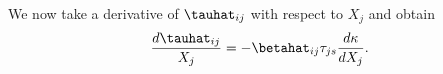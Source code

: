 We now take a derivative of $\tauhat_{i j}$ with respect to $X_j$ and obtain
\begin{equation}
\frac{d \tauhat_{i j}}{X_j}  = -\betahat_{i j} \tau_{j s} \frac{d \kappa}{d X_j}. 
\end{equation}
  